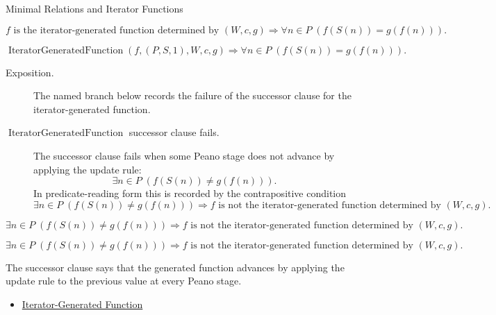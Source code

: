 \begin{topicbox}{Minimal Relations and Iterator Functions}
\begin{remark*}
\[
f \text{ is the iterator-generated function determined by } (W,c,g)
\Longrightarrow
\forall n\in P\;(f(S(n))=g(f(n))).
\]
\end{remark*}

\begin{remark*}
\[
\operatorname{IteratorGeneratedFunction}(f,(P,S,1),W,c,g)
\Longrightarrow
\forall n\in P\;(f(S(n))=g(f(n))).
\]
\end{remark*}



\begin{remark*}
\begin{description}
  \item[Exposition.] The named branch below records the failure of the successor
  clause for the iterator-generated function.
  \item[\(\operatorname{IteratorGeneratedFunction}\) successor clause fails.]
  The successor clause fails when some Peano stage does not advance by applying
  the update rule:
  \[
  \exists n\in P\;(f(S(n))\neq g(f(n))).
  \]
  In predicate-reading form this is recorded by the contrapositive condition
  \[
  \exists n\in P\;(f(S(n))\neq g(f(n)))
  \Longrightarrow
  f \text{ is not the iterator-generated function determined by } (W,c,g).
  \]
\end{description}
\end{remark*}

\begin{remark*}
\[
\exists n\in P\;(f(S(n))\neq g(f(n)))
\Longrightarrow
f \text{ is not the iterator-generated function determined by } (W,c,g).
\]
\end{remark*}

\begin{remark*}
\[
\exists n\in P\;(f(S(n))\neq g(f(n)))
\Longrightarrow
f \text{ is not the iterator-generated function determined by } (W,c,g).
\]
\end{remark*}

\begin{remark*}[Interpretation]
The successor clause says that the generated function advances by applying
the update rule to the previous value at every Peano stage.
\end{remark*}

\begin{dependencies}
\begin{itemize}
  \item \hyperref[def:iterator-generated-function]{Iterator-Generated Function}
\end{itemize}
\end{dependencies}


\end{topicbox}
